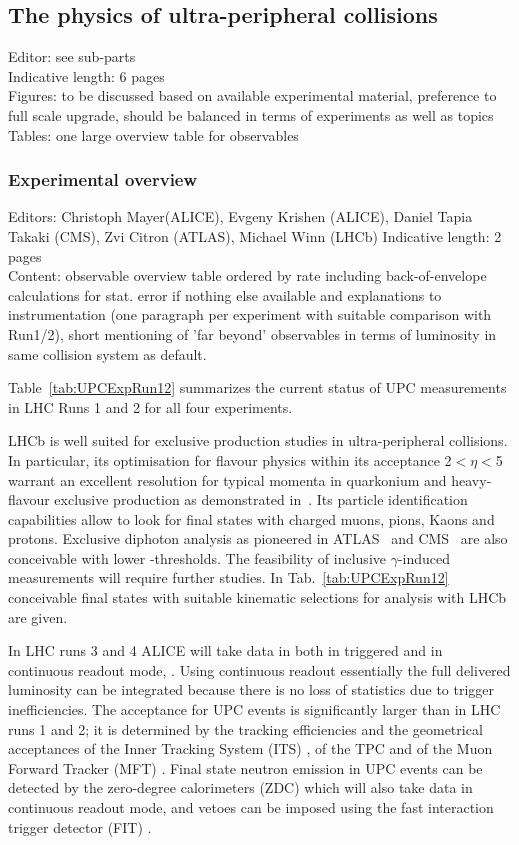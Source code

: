\documentclass[../report.tex]{subfiles}
\begin{document}
\subsection{The physics of ultra-peripheral collisions}
Editor: see sub-parts\\
Indicative length: 6 pages\\
Figures: to be discussed based on available experimental material, preference to full scale upgrade, should be balanced in terms of experiments as well as topics\\
Tables: one large overview table for observables
\subsubsection{Experimental overview}
Editors: Christoph Mayer(ALICE), Evgeny Krishen (ALICE), Daniel Tapia Takaki (CMS), Zvi Citron (ATLAS), Michael Winn (LHCb)
Indicative length: 2 pages\\
Content: observable overview table ordered by rate including back-of-envelope calculations for stat. error if nothing else available and explanations to instrumentation (one paragraph per experiment with suitable comparison with Run1/2), short mentioning of 'far beyond' observables in terms of luminosity in same collision system as default.

Table~\ref{tab:UPCExpRun12} summarizes the current status of UPC
measurements in LHC Runs 1 and 2 for all four experiments.

LHCb is well suited for exclusive production studies in ultra-peripheral collisions. In particular, its optimisation for flavour physics within its acceptance 2$<\eta<$5 warrant an excellent resolution for typical momenta in quarkonium and heavy-flavour exclusive production as demonstrated in~\cite{LHCb-CONF-2018-003}. Its particle identification capabilities allow to look for final states with charged muons, pions, Kaons and protons. Exclusive diphoton analysis as pioneered in ATLAS~\cite{Aaboud:2017bwk} and CMS~\cite{CMS-PAS-FSQ-16-012} are also conceivable with lower \ET-thresholds. The feasibility of inclusive $\gamma$-induced measurements will require further studies. In Tab.~\ref{tab:UPCExpRun12} conceivable final states with suitable kinematic selections for analysis with LHCb are given.

In LHC runs 3 and 4 ALICE \cite{Abelevetal:2014cna} will take data in
both in triggered and in continuous readout mode,
\cite{Buncic:2015ari}. Using continuous
readout \cite{Antoniolietal:2013} essentially the full delivered luminosity can be integrated
because there is no loss of statistics due to trigger
inefficiencies. The acceptance for UPC events is significantly larger
than in LHC runs 1 and 2; it is determined by the tracking
efficiencies and the geometrical acceptances of the Inner Tracking
System (ITS) \cite{Abelevetal:2014dna}, of the TPC
\cite{ALICE:2014qrd} and of the Muon Forward Tracker (MFT) \cite{Uras:2012af}. Final
state neutron emission in UPC events can be detected by the
zero-degree calorimeters (ZDC) which will also take data in continuous
readout mode, and vetoes can be imposed using the fast interaction
trigger detector (FIT)
.
\end{document}
